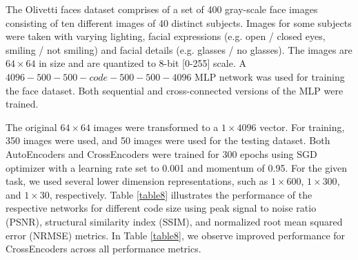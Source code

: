 \documentclass{jcmlatex}
\begin{document}
The Olivetti faces dataset \cite{minear2004lifespan} comprises of a set of 400 gray-scale face images consisting of ten different images of 40 distinct subjects. Images for some subjects were taken with varying lighting, facial expressions (e.g. open / closed eyes, smiling / not smiling) and facial details (e.g. glasses / no glasses). %
The images are $64\times64$ in size and are quantized to 8-bit [0-255] scale. A $4096-500-500-code-500-500-4096$ MLP network was used for training the face dataset. Both sequential and cross-connected versions of the MLP were trained. 

The original $64\times64$ images were transformed to a $1\times4096$ vector. For training, 350 images were used, and 50 images were used for the testing dataset. Both AutoEncoders and CrossEncoders were trained for 300 epochs using SGD optimizer with a learning rate set to 0.001 and momentum of 0.95. For the given task, we used several lower dimension representations, such as $1\times600$, $1\times300$, and $1\times30$, respectively. Table \ref{table8} illustrates the performance of the respective networks for different code size using peak signal to noise ratio (PSNR), structural similarity index (SSIM), and normalized root mean squared error (NRMSE) metrics. In Table \ref{table8}, we observe improved performance for CrossEncoders across all performance metrics.
\end{document}
